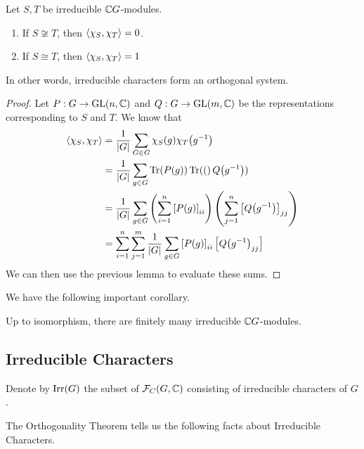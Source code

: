 \begin{boxtheorem} \label{Ch2:Thm:Orth_Char}
    Let $S, T$ be irreducible $\mathbb{C} G$-modules.
    \begin{enumerate}[label = \normalfont \arabic*., noitemsep]
        \item If $S \not\cong T$, then $\left\langle \chi_S, \chi_T \right\rangle = 0$.
        \item If $S \cong T$, then $\left\langle \chi_S, \chi_T \right\rangle = 1$
    \end{enumerate}
    In other words, irreducible characters form an orthogonal system.
\end{boxtheorem}
\begin{proof}
    Let $P : G \to \operatorname{GL}\!\left( n, \mathbb{C} \right)$ and $Q : G \to \operatorname{GL}\!\left( m, \mathbb{C} \right)$ be the representations corresponding to $S$ and $T$. We know that
    \begin{align*}
        \left\langle \chi_S, \chi_T \right\rangle &=
        \frac{1}{\left\lvert G \right\rvert} \sum_{G \in G} \chi_S(g) \chi_T\!\left( g^{-1} \right) \\
        &= \frac{1}{\left\lvert G \right\rvert} \sum_{g \in G} \operatorname{Tr}\!\left( P(g) \right) \operatorname{Tr}\!\left( ( \right)Q\!\left( g^{-1} \right)) \\
        &= \frac{1}{\left\lvert G \right\rvert} \sum_{g \in G} \left( \sum_{i = 1}^{n} \left[ P(g) \right]_{ii} \right)\left( \sum_{j=1}^{n} \left[ Q\!\left( g^{-1} \right) \right]_{jj} \right) \\
        &= \sum_{i=1}^{n} \sum_{j=1}^{m} \frac{1}{\left\lvert G \right\rvert} \sum_{g \in G} \left[ P(g) \right]_{ii} \left[ Q\!\left( g^{-1} \right)_{jj} \right]
    \end{align*}
    We can then use the previous lemma to evaluate these sums.
\end{proof}

We have the following important corollary.

\begin{corollary}
    Up to isomorphism, there are finitely many irreducible $\mathbb{C} G$-modules.
\end{corollary}

\subsection{Irreducible Characters}

\begin{boxnotation}
    Denote by $\operatorname{Irr}\!\left( G \right)$ the subset of $\mathcal{F}_C\!\left( G, \mathbb{C} \right)$ consisting of irreducible characters of $G$.
\end{boxnotation}

The Orthogonality Theorem tells us the following facts about Irreducible Characters.

